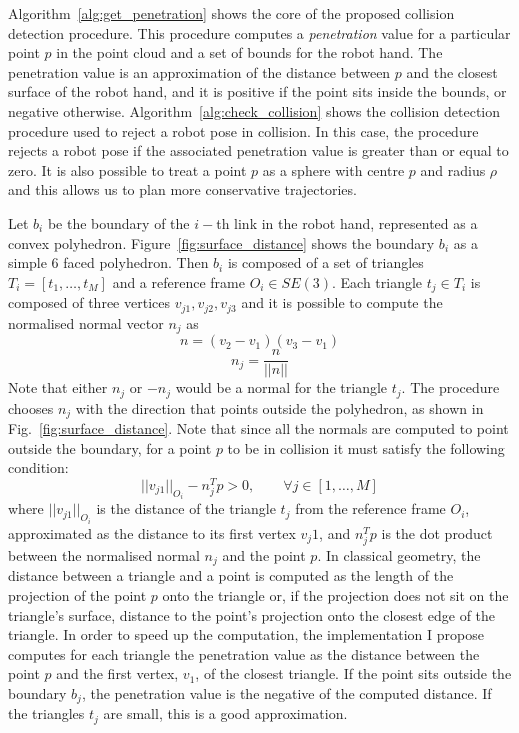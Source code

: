 Algorithm~\ref{alg:get_penetration} shows the core of the proposed collision detection procedure. This procedure computes a \emph{penetration} value for a particular point $p$ in the point cloud and a set of bounds for the robot hand. The penetration value is an approximation of the distance between $p$ and the closest surface of the robot hand, and it is positive if the point sits inside the bounds, or negative otherwise. Algorithm~\ref{alg:check_collision} shows the collision detection procedure used to reject a robot pose in collision. In this case, the procedure rejects a robot pose if the associated penetration value is greater than or equal to zero. It is also possible to treat a point $p$ as a sphere with centre $p$ and radius $\rho$ and this allows us to plan more conservative trajectories. 

Let $b_i$ be the boundary of the $i-$th link in the robot hand, represented as a convex polyhedron. Figure~\ref{fig:surface_distance} shows the boundary $b_i$ as a simple 6 faced polyhedron. Then $b_i$ is composed of a set of triangles $T_i=[t_1,\dots,t_M]$ and a reference frame $O_i\in SE(3)$. Each triangle $t_j\in T_i$ is composed of three vertices $v_{j1},v_{j2},v_{j3}$ and it is possible to compute the normalised normal vector $n_j$ as
$$
n=(v_2-v_1)(v_3-v_1)
$$
$$
n_j=\frac{n}{||n||}
$$
Note that either $n_j$ or $-n_j$ would be a normal for the triangle $t_j$. The procedure chooses $n_j$ with the direction that points outside the polyhedron, as shown in Fig.~\ref{fig:surface_distance}. 
Note that since all the normals are computed to point outside the boundary, for a point $p$ to be in collision it must satisfy the following condition:
$$
||v_{j1}||_{O_i}-n_j^Tp > 0, \qquad\forall j\in[1,\dots,M]
$$
where $||v_{j1}||_{O_i}$ is the distance of the triangle $t_j$ from the reference frame $O_i$, approximated as the distance to its first vertex $v_j1$, and $n_j^Tp$ is the dot product between the normalised normal $n_j$ and the point $p$. In classical geometry, the distance between a triangle and a point is computed as the length of the projection of the point $p$ onto the triangle or, if the projection does not sit on the triangle's surface, distance to the point's projection onto the closest edge of the triangle. In order to speed up the computation, the implementation I propose computes for each triangle the penetration value as the distance between the point $p$ and the first vertex, $v_1$, of the closest triangle. If the point sits outside the boundary $b_j$, the penetration value is the negative of the computed distance. If the triangles $t_j$ are small, this is a good approximation.

